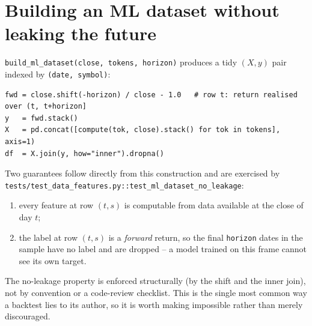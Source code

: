 \section{Building an ML dataset without leaking the future}

\texttt{build\_ml\_dataset(close, tokens, horizon)} produces a tidy
$(X, y)$ pair indexed by \texttt{(date, symbol)}:

\begin{lstlisting}
fwd = close.shift(-horizon) / close - 1.0   # row t: return realised over (t, t+horizon]
y   = fwd.stack()
X   = pd.concat([compute(tok, close).stack() for tok in tokens], axis=1)
df  = X.join(y, how="inner").dropna()
\end{lstlisting}

Two guarantees follow directly from this construction and are exercised by
\texttt{tests/test\_data\_features.py::test\_ml\_dataset\_no\_leakage}:

\begin{enumerate}
  \item every feature at row $(t, s)$ is computable from data available at the
  close of day $t$;
  \item the label at row $(t, s)$ is a \emph{forward} return, so the final
  \texttt{horizon} dates in the sample have no label and are dropped -- a model
  trained on this frame cannot see its own target.
\end{enumerate}

\begin{designnote}
The no-leakage property is enforced structurally (by the shift and the inner
join), not by convention or a code-review checklist. This is the single most
common way a backtest lies to its author, so it is worth making impossible
rather than merely discouraged.
\end{designnote}

